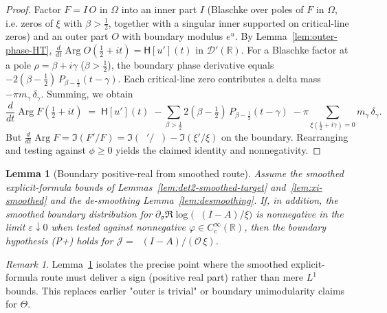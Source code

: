 \documentclass[11pt]{article}
\newtheorem{lemma}[theorem]{Lemma}
\theoremstyle{definition}
\theoremstyle{remark}
\newtheorem{remark}[theorem]{Remark}
\newcommand{\R}{\mathbb{R}}
\DeclareMathOperator{\dettwo}{det_2}
\DeclareMathOperator{\Arg}{Arg}
\begin{document}
\begin{proof}
Factor \(F=I\,O\) in \(\Omega\) into an inner part \(I\) (Blaschke over poles of \(F\) in \(\Omega\), i.e. zeros of \(\xi\) with \(\beta>\tfrac12\), together with a singular inner supported on critical-line zeros) and an outer part \(O\) with boundary modulus \(e^{u}\). By Lemma~\ref{lem:outer-phase-HT}, \(\tfrac{d}{dt}\Arg O(\tfrac12+it)=\mathsf H[u'](t)\) in \(\mathcal D'(\R)\). For a Blaschke factor at a pole \(\rho=\beta+i\gamma\) (\(\beta>\tfrac12\)), the boundary phase derivative equals \(-2(\beta-\tfrac12)\,P_{\beta-\tfrac12}(t-\gamma)\). Each critical-line zero contributes a delta mass \(-\pi m_\gamma\,\delta_\gamma\). Summing, we obtain
\[
 \frac{d}{dt}\Arg F(\tfrac12+it)\;=\; \mathsf H[u'](t)\;-
 \sum_{\beta>\tfrac12}2(\beta-\tfrac12)\,P_{\beta-\tfrac12}(t-\gamma)\;-
 \pi\sum_{\xi(\tfrac12+i\gamma)=0} m_\gamma\,\delta_\gamma.
\]
But \(\tfrac{d}{dt}\Arg F=\Im(F'/F)=\Im(\dettwo'/\dettwo)-\Im(\xi'/\xi)\) on the boundary. Rearranging and testing against \(\phi\ge 0\) yields the claimed identity and nonnegativity.
\end{proof}
\begin{lemma}[Boundary positive-real from smoothed route]\label{lem:boundary-posreal}
Assume the smoothed explicit-formula bounds of Lemmas~\ref{lem:det2-smoothed-target} and~\ref{lem:xi-smoothed} and the de-smoothing Lemma~\ref{lem:desmoothing}. If, in addition, the smoothed boundary distribution for \(\partial_\sigma\Re\log\big(\dettwo(I-A)/\xi\big)\) is nonnegative in the limit \(\varepsilon\downarrow 0\) when tested against nonnegative \(\varphi\in C_c^\infty(\R)\), then the boundary hypothesis \emph{(P+)} holds for \(\mathcal J=\dettwo(I-A)/(\mathcal O\,\xi)\).
\end{lemma}

\begin{remark}
Lemma~\ref{lem:boundary-posreal} isolates the precise point where the smoothed explicit-formula route must deliver a sign (positive real part) rather than mere $L^1$ bounds. This replaces earlier "outer is trivial" or boundary unimodularity claims for \(\Theta\).
\end{remark}
\end{document}
